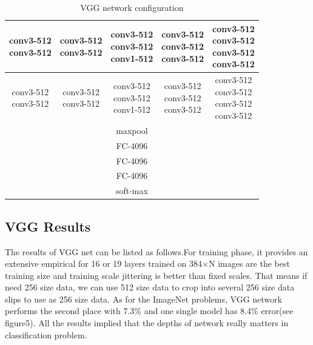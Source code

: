 \documentclass{article}
\begin{document}
\begin{table}
\begin{tabular}{|c|c|c|c|c|}
	\hline
		\tabincell{c}{conv3-512 \\ conv3-512} & \tabincell{c}{conv3-512 \\ conv3-512} & \tabincell{c}{conv3-512 \\ conv3-512 \\ conv1-512} & \tabincell{c}{conv3-512 \\ conv3-512 \\ conv3-512} & \tabincell{c}{conv3-512 \\ conv3-512 \\ conv3-512 \\ conv3-512}\\
	\hline
		\tabincell{c}{conv3-512 \\ conv3-512} & \tabincell{c}{conv3-512 \\ conv3-512} & \tabincell{c}{conv3-512 \\ conv3-512 \\ conv1-512} & \tabincell{c}{conv3-512 \\ conv3-512 \\ conv3-512} & \tabincell{c}{conv3-512 \\ conv3-512 \\ conv3-512 \\ conv3-512}\\
	\hline \multicolumn{5}{c}{maxpool} \\
	\hline \multicolumn{5}{c}{FC-4096} \\
	\hline \multicolumn{5}{c}{FC-4096} \\
	\hline \multicolumn{5}{c}{FC-4096} \\
	\hline \multicolumn{5}{c}{soft-max} \\
	\hline
	\end{tabular}
\caption{VGG network configuration}
\label{Table:2}
\end{table}
\subsection{VGG Results}
The results of VGG net can be listed as follows.For training phase, it provides an extensive empirical for 16 or 19 layers trained on 384$\times$N images are the best training size and training scale jittering is better than fixed scales. That means if need 256 size data, we can use 512 size data to crop into several 256 size data slips to use as 256 size data. As for the ImageNet problems, VGG network performs the second place with 7.3\% and one single model has 8.4\% error(see figure5). All the results implied that the depths of network really matters in classification problem.
\end{document}
